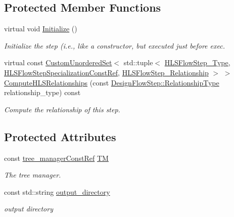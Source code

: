 \subsection*{Protected Member Functions}
\begin{DoxyCompactItemize}
\item 
virtual void \hyperlink{classTestbenchValuesXMLGeneration_a33f05a86d9767b3503b981d95ae7d604}{Initialize} ()
\begin{DoxyCompactList}\small\item\em Initialize the step (i.\+e., like a constructor, but executed just before exec. \end{DoxyCompactList}\item 
virtual const \hyperlink{classCustomUnorderedSet}{Custom\+Unordered\+Set}$<$ std\+::tuple$<$ \hyperlink{hls__step_8hpp_ada16bc22905016180e26fc7e39537f8d}{H\+L\+S\+Flow\+Step\+\_\+\+Type}, \hyperlink{hls__step_8hpp_a5fdd2edf290c196531d21d68e13f0e74}{H\+L\+S\+Flow\+Step\+Specialization\+Const\+Ref}, \hyperlink{hls__step_8hpp_a3ad360b9b11e6bf0683d5562a0ceb169}{H\+L\+S\+Flow\+Step\+\_\+\+Relationship} $>$ $>$ \hyperlink{classTestbenchValuesXMLGeneration_a285489d3ba4ecfb7a4803b6933102366}{Compute\+H\+L\+S\+Relationships} (const \hyperlink{classDesignFlowStep_a723a3baf19ff2ceb77bc13e099d0b1b7}{Design\+Flow\+Step\+::\+Relationship\+Type} relationship\+\_\+type) const
\begin{DoxyCompactList}\small\item\em Compute the relationship of this step. \end{DoxyCompactList}\end{DoxyCompactItemize}
\subsection*{Protected Attributes}
\begin{DoxyCompactItemize}
\item 
const \hyperlink{tree__manager_8hpp_a792e3f1f892d7d997a8d8a4a12e39346}{tree\+\_\+manager\+Const\+Ref} \hyperlink{classTestbenchValuesXMLGeneration_ad30e7f826dc916e3eaebc4b2a7908516}{TM}
\begin{DoxyCompactList}\small\item\em The tree manager. \end{DoxyCompactList}\item 
const std\+::string \hyperlink{classTestbenchValuesXMLGeneration_a60fe2f79cf05d659d1746be6b0c9c605}{output\+\_\+directory}
\begin{DoxyCompactList}\small\item\em output directory \end{DoxyCompactList}\end{DoxyCompactItemize}
